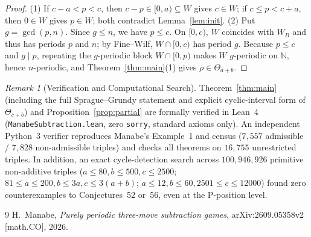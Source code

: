 \documentclass[11pt]{article}
\theoremstyle{remark}
\newtheorem{remark}[theorem]{Remark}
\begin{document}
\begin{proof}
(1) If $c - a < p < c$, then $c - p \in [0, a) \subseteq W$ gives $c \in W$; if $c \le p < c + a$, then $0 \in W$ gives $p \in W$; both contradict Lemma~\ref{lem:init}.
(2) Put $g = \gcd(p, n)$. Since $g \le n$, we have $p \le c$. On $[0, c)$, $W$ coincides with $W_B$ and thus has periods $p$ and $n$; by Fine--Wilf, $W \cap [0, c)$ has period $g$. Because $p \le c$ and $g \mid p$, repeating the $g$-periodic block $W \cap [0, p)$ makes $W$ $g$-periodic on $\mathbb{N}$, hence $n$-periodic, and Theorem~\ref{thm:main}(1) gives $\rho \in \Theta_{a+b}$.
\end{proof}

\begin{remark}[Verification and Computational Search]
Theorem~\ref{thm:main} (including the full Sprague--Grundy statement and explicit cyclic-interval form of $\Theta_{c+b}$) and Proposition~\ref{prop:partial} are formally verified in Lean~4 (\texttt{ManabeSubtraction.lean}, zero \texttt{sorry}, standard axioms only). An independent Python~3 verifier reproduces Manabe's Example~1 and census ($7{,}557$ admissible / $7{,}828$ non-admissible triples) and checks all theorems on $16{,}755$ unrestricted triples. In addition, an exact cycle-detection search across $100{,}946{,}926$ primitive non-additive triples ($a \le 80, b \le 500, c \le 2500$; $81 \le a \le 200, b \le 3a, c \le 3(a+b)$; $a \le 12, b \le 60, 2501 \le c \le 12000$) found zero counterexamples to Conjectures~52 or~56, even at the $\mathrm{P}$-position level.
\end{remark}

\begin{thebibliography}{9}
H.~Manabe, \emph{Purely periodic three-move subtraction games}, arXiv:2609.05358v2 [math.CO], 2026.
\end{thebibliography}
\end{document}
